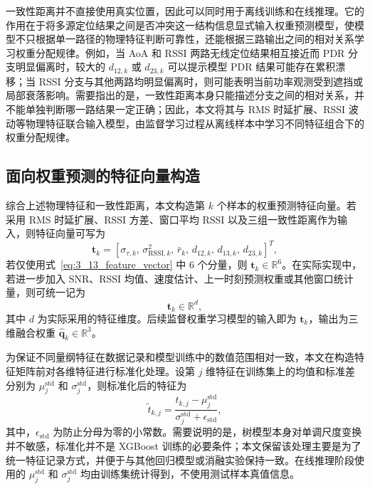 一致性距离并不直接使用真实位置，因此可以同时用于离线训练和在线推理。它的作用在于将多源定位结果之间是否冲突这一结构信息显式输入权重预测模型，使模型不只根据单一路径的物理特征判断可靠性，还能根据三路输出之间的相对关系学习权重分配规律。例如，当 AoA 和 RSSI 两路无线定位结果相互接近而 PDR 分支明显偏离时，较大的 \(d_{12,k}\) 或 \(d_{23,k}\) 可以提示模型 PDR 结果可能存在累积漂移；当 RSSI 分支与其他两路均明显偏离时，则可能表明当前功率观测受到遮挡或局部衰落影响。需要指出的是，一致性距离本身只能描述分支之间的相对关系，并不能单独判断哪一路结果一定正确；因此，本文将其与 RMS 时延扩展、RSSI 波动等物理特征联合输入模型，由监督学习过程从离线样本中学习不同特征组合下的权重分配规律。

\subsection{面向权重预测的特征向量构造}
\label{subsec:3_3_3}

综合上述物理特征和一致性距离，本文构造第 \(k\) 个样本的权重预测特征向量。若采用 RMS 时延扩展、RSSI 方差、窗口平均 RSSI 以及三组一致性距离作为输入，则特征向量可写为
\begin{equation}
\mathbf{t}_k
=
\left[
\sigma_{\tau,k},\,
\sigma^2_{\mathrm{RSSI},k},\,
\bar{r}_k,\,
d_{12,k},\,
d_{13,k},\,
d_{23,k}
\right]^T,
\label{eq:3_13_feature_vector}
\end{equation}
若仅使用式~\eqref{eq:3_13_feature_vector} 中 6 个分量，则 \(\mathbf{t}_k\in\mathbb{R}^{6}\)。在实际实现中，若进一步加入 SNR、RSSI 均值、速度估计、上一时刻预测权重或其他窗口统计量，则可统一记为
\begin{equation}
\mathbf{t}_k\in\mathbb{R}^{d},
\label{eq:3_14_general_feature_dim}
\end{equation}
其中 \(d\) 为实际采用的特征维度。后续监督权重学习模型的输入即为 \(\mathbf{t}_k\)，输出为三维融合权重 \(\hat{\mathbf{q}}_k\in\mathbb{R}^{3}\)。

为保证不同量纲特征在数据记录和模型训练中的数值范围相对一致，本文在构造特征矩阵前对各维特征进行标准化处理。设第 \(j\) 维特征在训练集上的均值和标准差分别为 \(\mu_j^{\mathrm{std}}\) 和 \(\sigma_j^{\mathrm{std}}\)，则标准化后的特征为
\begin{equation}
\tilde{t}_{k,j}
=
\frac{t_{k,j}-\mu_j^{\mathrm{std}}}{\sigma_j^{\mathrm{std}}+\epsilon_{\mathrm{std}}},
\label{eq:3_15_feature_standardization}
\end{equation}
其中，\(\epsilon_{\mathrm{std}}\) 为防止分母为零的小常数。需要说明的是，树模型本身对单调尺度变换并不敏感，标准化并不是 XGBoost 训练的必要条件；本文保留该处理主要是为了统一特征记录方式，并便于与其他回归模型或消融实验保持一致。在线推理阶段使用的 \(\mu_j^{\mathrm{std}}\) 和 \(\sigma_j^{\mathrm{std}}\) 均由训练集统计得到，不使用测试样本真值信息。

